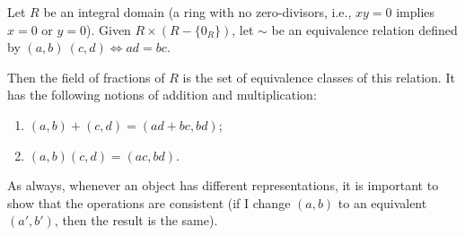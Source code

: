 \begin{defn}
	Let $R$ be an integral domain (a ring with no zero-divisors, i.e., $xy = 0$ implies $x = 0$ or $y = 0$).
	Given $R \times (R - \{0_R\})$, let $\sim$ be an equivalence relation defined by $(a, b) ~ (c, d) \iff ad = bc$.

	Then the field of fractions of $R$ is the set of equivalence classes of this relation. It has the following notions of addition and multiplication:
	\begin{enumerate}
		\item $(a, b) + (c, d) = (ad + bc, bd)$;
		\item $(a, b) (c, d) = (ac, bd)$.
	\end{enumerate}

	As always, whenever an object has different representations, it is important to show that the operations are consistent (if I change $(a, b)$ to an equivalent $(a', b')$, then the result is the same).
\end{defn}
